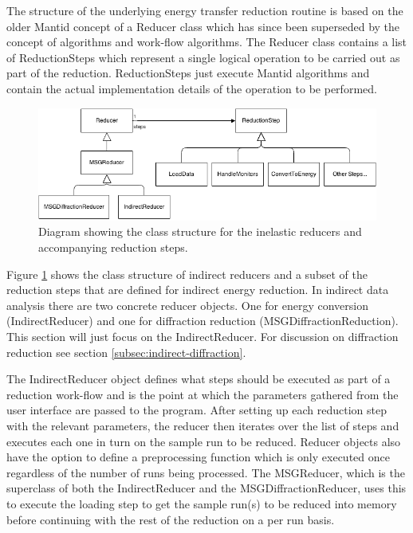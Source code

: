 \documentclass[paper=a4, fontsize=11pt]{scrartcl}	%
\numberwithin{equation}{section}															%
\numberwithin{figure}{section}																%
\numberwithin{table}{section}																%
\begin{document}
The structure of the underlying energy transfer reduction routine is based on the older Mantid concept of a Reducer class which has since been superseded by the concept of algorithms and work-flow algorithms. The Reducer class contains a list of ReductionSteps which represent a single logical operation to be carried out as part of the reduction. ReductionSteps just execute Mantid algorithms and contain the actual implementation details of the operation to be performed.

\begin{figure}[H]
\centering
\includegraphics[width=1\textwidth]{img/uml/class_diagrams/Reducer_structure.png}
\caption{Diagram showing the class structure for the inelastic reducers and accompanying reduction steps.}
\label{fig:reducer-structure-diagram}
\end{figure}

Figure \ref{fig:reducer-structure-diagram} shows the class structure of indirect reducers and a subset of the reduction steps that are defined for indirect energy reduction. In indirect data analysis there are two concrete reducer objects. One for energy conversion (IndirectReducer) and one for diffraction reduction (MSGDiffractionReduction). This section will just focus on the IndirectReducer. For discussion on diffraction reduction see section \ref{subsec:indirect-diffraction}.

The IndirectReducer object defines what steps should be executed as part of a reduction work-flow and is the point at which the parameters gathered from the user interface are passed to the program. After setting up each reduction step with the relevant parameters, the reducer then iterates over the list of steps and executes each one in turn on the sample run to be reduced. Reducer objects also have the option to define a preprocessing function which is only executed once regardless of the number of runs being processed. The MSGReducer, which is the superclass of both the IndirectReducer and the MSGDiffractionReducer, uses this to execute the loading step to get the sample run(s) to be reduced into memory before continuing with the rest of the reduction on a per run basis.
\end{document}
